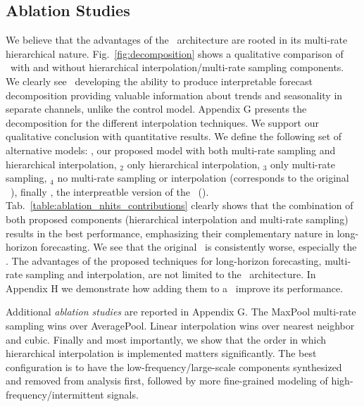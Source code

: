 \subsection{Ablation Studies}
\label{appendix:ablation_main_contributions}

We believe that the advantages of the \ours\ architecture are rooted in its multi-rate hierarchical nature. Fig.~\ref{fig:decomposition} shows a qualitative comparison of \ours\ with and without hierarchical interpolation/multi-rate sampling components. We clearly see \ours\ developing the ability to produce interpretable forecast decomposition providing valuable information about trends and seasonality in separate channels, unlike the control model. Appendix G presents the decomposition for the different interpolation techniques. We support our qualitative conclusion with quantitative results. We define the following set of alternative models: \ours, our proposed model with both multi-rate sampling and hierarchical interpolation, \ours$_{2}$ only hierarchical interpolation, \ours$_{3}$ only multi-rate sampling, \ours$_{4}$ no multi-rate sampling or interpolation (corresponds to the original \NBEATSg~\citep{oreshkin2020nbeats}), finally \NBEATSi, the interpreatble version of the \NBEATS\ (\citep{oreshkin2020nbeats}). Tab.~\ref{table:ablation_nhits_contributions} clearly shows that the combination of both proposed components (hierarchical interpolation and multi-rate sampling) results in the best performance, emphasizing their complementary nature in long-horizon forecasting. We see that the original \NBEATS\ is consistently worse, especially the \NBEATSi. The advantages of the proposed techniques for long-horizon forecasting, multi-rate sampling and interpolation, are not limited to the \ours\ architecture. In Appendix H we demonstrate how adding them to a \DilRNN\ improve its performance.



Additional \emph{ablation studies} are reported in Appendix G. The MaxPool multi-rate sampling wins over AveragePool. Linear interpolation wins over nearest neighbor and cubic. Finally and most importantly, we show that the order in which hierarchical interpolation is implemented matters significantly. The best configuration is to have the low-frequency/large-scale components  synthesized and removed from analysis first, followed by more fine-grained modeling of high-frequency/intermittent signals.
